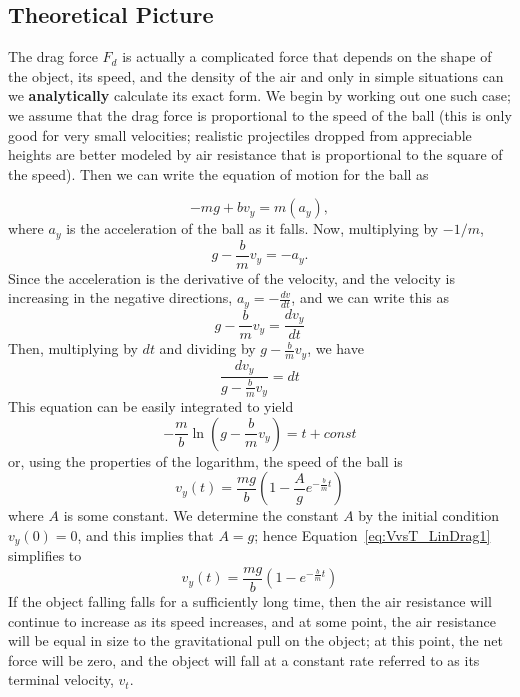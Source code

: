 \subsection{Theoretical Picture}
\label{sec-LinDragTheory}
The drag force $F_d$ is actually a complicated force that depends on the shape of the object, its speed, and the density of the air and only in simple situations can we \textbf{analytically} calculate its exact form. We begin by working out one such case; we assume that the drag force is proportional to the speed of the ball (this is only good for very small velocities; realistic projectiles dropped from appreciable heights are better modeled by air resistance that is proportional to the square of the speed). Then we can write the equation of motion for the ball as 

$$- m g + b v_y = m(a_y),$$
where $a_y$ is the acceleration of the ball as it falls. Now, multiplying by $-1/m$,
$$ g - \frac{b}{m} v_y = -a_y .$$
Since the acceleration is the derivative of the velocity, and the velocity is increasing in the negative directions, $a_y = -\frac{dv}{dt}$, and we can write this as 
\begin{equation}
	g - \frac{b}{m} v_y = \frac{d v_y}{dt}
	\label{eq-diffeqLinDrag}
\end{equation}
Then, multiplying by $dt$ and dividing by $g - \frac{b}{m} v_y$, we have
$$
	\frac{dv_y}{g - \frac{b}{m} v_y} = dt
$$
This equation can be easily integrated to yield 
$$
-\frac{m}{b}\ln\left(g - \frac{b}{m} v_y\right) = t + const
$$
or, using the properties of the logarithm, the speed of the ball is 
\begin{equation}
v_{y} (t) = \frac{mg}{b}\left(1-\frac{A}{g}e^{-\frac{b}{m}t}\right)
\label{eq:VvsT_LinDrag1}
\end{equation}
where $A$ is some constant. We determine the constant $A$ by the initial condition $v_y(0) = 0$, and this implies that $A=g$; hence Equation~\ref{eq:VvsT_LinDrag1} simplifies to
\begin{equation}
v_{y} (t) = \frac{mg}{b}\left(1-e^{-\frac{b}{m}t}\right)
\label{eq:VvsT_LinDrag2}
\end{equation}
If the object falling falls for a sufficiently long time, then the air resistance will continue to increase as its speed increases, and at some point, the air resistance will be equal in size to the gravitational pull on the object; at this point, the net force will be zero, and the object will fall at a constant rate referred to as its terminal velocity, $v_t$. 

